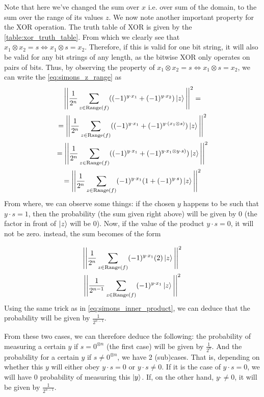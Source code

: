 Note that here we've changed the sum over $x$ i.e. over sum of the domain, to the sum over the range of its values $z$.
We now note another important property for the XOR operation. The truth table of XOR is given by the \autoref{table:xor_truth_table}.
From which we clearly see that $x_1 \otimes x_2 = s \iff x_1 \otimes s = x_2$. Therefore, if this is valid for one bit string, it 
will also be valid for any bit strings of any length, as the bitwise XOR only operates on pairs of bits.
Thus, by observing the property of $x_1 \otimes x_2 = s \iff x_1 \otimes s = x_2$, we can write the \autoref{eq:simons_z_range} 
as
\begin{gather}
  \Bigg|\Bigg| \frac{1}{2^n} \sum_{z\in \text{Range}(f)}((-1)^{y\cdot x_1} +(-1)^{y\cdot x_2})\ket{z} \Bigg| \Bigg|^2 =\\
  =\Bigg| \Bigg| \frac{1}{2^n} \sum_{z\in \text{Range}(f)}((-1)^{y\cdot x_1} +(-1)^{y\cdot (x_1 \otimes s)})\ket{z} \Bigg| \Bigg|^2 \\
  =\Bigg| \Bigg| \frac{1}{2^n} \sum_{z\in \text{Range}(f)}((-1)^{y\cdot x_1} +(-1)^{y\cdot x_1 \otimes y\cdot s)})\ket{z} \Bigg| \Bigg|^2 \\
  =\Bigg| \Bigg| \frac{1}{2^n} \sum_{z\in \text{Range}(f)} (-1)^{y\cdot x_1}(1+(-1)^{y\cdot s})\ket{z} \Bigg| \Bigg|^2 
\end{gather}
From where, we can observe some things: if the chosen $y$ happens to be such that $y\cdot s = 1$, then the probability (the sum given right above)
will be given by 0 (the factor in front of $\ket{z}$ will be 0). Now, if the value of the product $y\cdot s = 0$, it will not be zero.
instead, the sum becomes of the form 

\begin{gather}
  \Bigg| \Bigg| \frac{1}{2^n} \sum_{z\in \text{Range}(f)} (-1)^{y\cdot x_1}(2)\ket{z} \Bigg| \Bigg|^2 \\
  \Bigg| \Bigg| \frac{1}{2^{n-1}} \sum_{z\in \text{Range}(f)} (-1)^{y\cdot x_1}\ket{z} \Bigg| \Bigg|^2 
\end{gather}
Using the same trick as in \autoref{eq:simons_inner_product}, we can deduce that the probability will be given by $\frac{1}{2^{n-1}}$.

From these two cases, we can therefore deduce the following: the probability of measuring a certain $y$ if $s=0^{\otimes n}$ (the first case) will be given 
by $\frac{1}{2^n}$.
And the probability for a certain $y$ if $s\neq 0^{\otimes n}$, we have 2 (sub)cases. That is, depending on whether this $y$ will either obey
$y\cdot s=0$ or $y\cdot s\neq 0$. If it is the case of $y\cdot s=0$, we will have 0 probability of measuring this $\ket{y}$. If, on the other hand,
$y\cdot \neq 0$, it will be given by $\frac{1}{2^{n-1}}$. 


